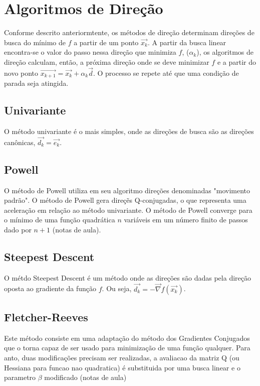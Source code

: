 \documentclass[10pt, a4paper]{article}
\begin{document}
\section{Algoritmos de Dire\c c\~ao}

Conforme descrito anteriormtente, os m\'etodos de dire\c c\~ao determinam dire\c c\~oes de busca do m\'inimo de $f$ a partir de um ponto $\vec{x_{k}}$. A partir da busca linear encontra-se o valor do passo nessa dire\c c\~ao que minimiza $f$, ($\alpha_{k}$), os algoritmos de dire\c c\~ao calculam, ent\~ao, a pr\'oxima dire\c c\~ao onde se deve minimizar $f$ e a partir do novo ponto $\vec{x_{k+1}}=\vec{x_k}+\alpha_{k}\vec{d}$. O processo se repete at\'e que uma condi\c c\~ao de parada seja atingida.

\subsection{Univariante}

O m\'etodo univariante \'e o mais simples, onde as dire\c c\~oes de busca s\~ao as dire\c c\~oes can\^onicas, $\vec{d_{k}}=\vec{e_{k}}$.

\subsection{Powell}

O m\'etodo de Powell utiliza em seu algoritmo dire\c c\~oes denominadas "movimento padr\~ao". O m\'etodo de Powell gera dire\c c\~es Q-conjugadas, o que representa uma acelera\c c\~ao em rela\c c\~ao ao m\'etodo univariante. O m\'etodo de Powell converge para o m\'inimo de uma fun\c c\~ao quadr\'atica $n$ vari\'aveis em um n\'umero finito de passos dado por $n+1$ (notas de aula).

\subsection{Steepest Descent}

O m\'etdo Steepest Descent \'e um m\'etodo onde as dire\c c\~oes s\~ao dadas pela dire\c c\~ao oposta ao gradiente da fun\c c\~ao $f$. Ou seja, $\vec{d_{k}} = -\vec{\nabla} f(\vec{x_{k}})$.

\subsection{Fletcher-Reeves}

Este m\'etodo consiste em uma adapta\c c\~ao do m\'etodo dos Gradientes Conjugados que o torna capaz de ser usado para minimiza\c c\~ao de uma fun\c c\~ao qualquer. Para anto, duas modifica\c c\~oes precisam ser realizadas, a avaliacao da matriz Q (ou Hessiana para funcao nao quadratica) \'e substituida por uma busca linear e o parametro $\beta$ modificado (notas de aula)
\end{document}
